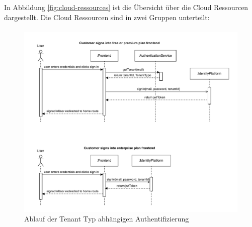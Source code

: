 In Abbildung \ref{fig:cloud-ressources} ist die Übersicht über die Cloud Ressourcen dargestellt. 
Die Cloud Ressourcen sind in zwei Gruppen unterteilt:
\paragraph{}

\begin{figure}[ht]
  \centering
  \includegraphics[width=\textwidth]{resources/03-runtime-view/pdf/authentication-sequence.pdf}
  \caption{Ablauf der Tenant Typ abhängigen Authentifizierung}
  \label{fig:authentication-sequence}
\end{figure}


